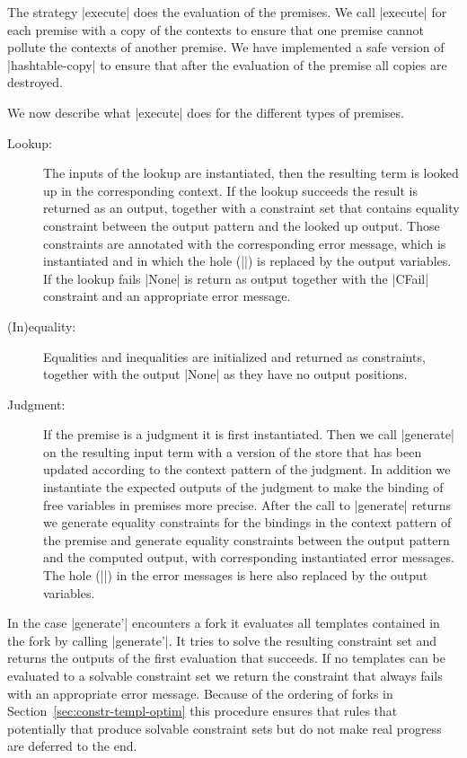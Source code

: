 The strategy \code|execute| does the evaluation of the premises. We
call \code|execute| for each premise with a copy of the contexts to
ensure that one premise cannot pollute the contexts of another
premise. We have implemented a safe version of \code|hashtable-copy|
to ensure that after the evaluation of the premise all copies are
destroyed.

We now describe what \code|execute| does for the different types of
premises.

\begin{description}
\item[Lookup:] The inputs of the lookup are instantiated, then the
  resulting term is looked up in the corresponding context. If the
  lookup succeeds the result is returned as an output, together with a
  constraint set that contains equality constraint between the output
  pattern and the looked up output. Those constraints are annotated
  with the corresponding error message, which is instantiated and in
  which the hole (\code|{}|) is replaced by the output variables. If
  the lookup fails \code|None| is return as output together with the
  \code|CFail| constraint and an appropriate error message.
\item[(In)equality:] Equalities and inequalities are initialized and
  returned as constraints, together with the output \code|None| as
  they have no output positions.
\item[Judgment:] If the premise is a judgment it is first
  instantiated. Then we call \code|generate| on the resulting input
  term with a version of the store that has been updated according to
  the context pattern of the judgment. In addition we instantiate the
  expected outputs of the judgment to make the binding of free
  variables in premises more precise. After the call to
  \code|generate| returns we generate equality constraints for the
  bindings in the context pattern of the premise and generate equality
  constraints between the output pattern and the computed output, with
  corresponding instantiated error messages. 
  The hole (\code|{}|) in the error messages is here also replaced by
  the output variables.
\end{description}

In the case \code|generate'| encounters a fork it evaluates all
templates contained in the fork by calling \code|generate'|. It tries
to solve the resulting constraint set and returns the outputs of the
first evaluation that succeeds. If no templates can be evaluated to a
solvable constraint set we return the constraint that always fails
with an appropriate error message. Because of the ordering of forks in
Section~\ref{sec:constr-templ-optim} this procedure ensures that rules
that potentially that produce solvable constraint sets but do not make
real progress are deferred to the end.

